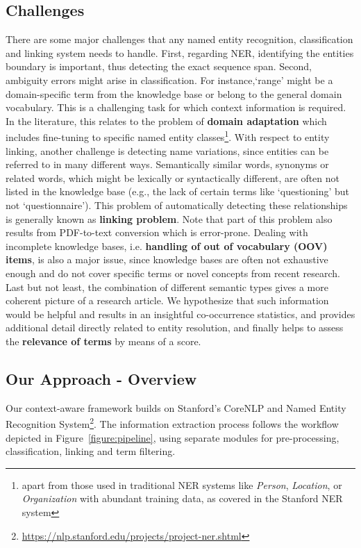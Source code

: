 \subsection{Challenges}
There are some major challenges that any named entity recognition, classification and linking system needs to handle.
First, regarding NER, identifying the entities boundary is important, thus detecting the exact sequence span. 
Second, ambiguity errors might arise in classification. For instance,`range' might be a domain-specific term from the knowledge base or belong to the general domain vocabulary. This is a challenging task for which context information is required. 
In the literature, this relates to the problem of \textbf{domain adaptation} which includes fine-tuning to specific named entity classes\footnote{apart from those used in traditional NER systems like \textit{Person}, \textit{Location}, or \textit{Organization} with abundant training data, as covered in the Stanford NER system\cite{finkel2005incorporating}}.
With respect to entity linking, another challenge is detecting name variations, since entities can be referred to in many different ways.
Semantically  similar words, synonyms or related words, which might be lexically or syntactically different, are often not listed in the knowledge base 
(e.g., the lack of certain terms like `questioning' but not `questionnaire').  This problem of automatically detecting these relationships is generally known as \textbf{linking problem}. 
Note that part of this problem also results from PDF-to-text conversion which is error-prone. 
Dealing with incomplete knowledge bases, i.e. \textbf{handling of out of vocabulary (OOV) items}, is also a major issue, since 
knowledge bases are often not exhaustive enough and do not cover specific terms or novel concepts from recent research.
Last but not least, the combination of different semantic types gives a more coherent picture of a research article. We hypothesize that such information would be helpful and results in an insightful co-occurrence statistics, and provides additional detail directly related to entity resolution, and finally helps to assess the \textbf{relevance of terms} by means of a score.

 
\subsection{Our Approach - Overview} 
Our context-aware framework builds on Stanford’s CoreNLP and Named Entity Recognition System\footnote{\url{https://nlp.stanford.edu/projects/project-ner.shtml}}. 
The information extraction process follows the workflow depicted in Figure~\ref{figure:pipeline}, using separate modules for pre-processing, classification, linking and term filtering.

